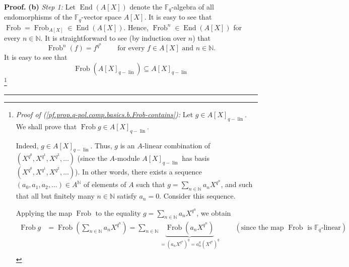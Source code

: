\documentclass[numbers=enddot,12pt,final,onecolumn,notitlepage]{scrartcl}%
\theoremstyle{definition}
\newenvironment{proof}[1][Proof]{\noindent\textbf{#1.} }{\ \rule{0.5em}{0.5em}}
\let\sumnonlimits\sum
\renewcommand{\sum}{\sumnonlimits\limits}
\begin{document}
\begin{proof}
\textbf{(b)} \textit{Step 1:} Let $\operatorname*{End}\left(  A\left[
X\right]  \right)  $ denote the $\mathbb{F}_{q}$-algebra of all endomorphisms
of the $\mathbb{F}_{q}$-vector space $A\left[  X\right]  $. It is easy to see
that $\operatorname*{Frob}=\operatorname*{Frob}\nolimits_{A\left[  X\right]
}\in\operatorname*{End}\left(  A\left[  X\right]  \right)  $. Hence,
$\operatorname*{Frob}\nolimits^{n}\in\operatorname*{End}\left(  A\left[
X\right]  \right)  $ for every $n\in\mathbb{N}$. It is straightforward to see
(by induction over $n$) that%
\begin{equation}
\operatorname*{Frob}\nolimits^{n}\left(  f\right)  =f^{q^{n}}%
\ \ \ \ \ \ \ \ \ \ \text{for every }f\in A\left[  X\right]  \text{ and }%
n\in\mathbb{N}. \label{pf.prop.q-pol.comp.basics.b.Frobn}%
\end{equation}
It is easy to see that
\begin{equation}
\operatorname*{Frob}\left(  A\left[  X\right]  _{q-\operatorname*{lin}%
}\right)  \subseteq A\left[  X\right]  _{q-\operatorname*{lin}}
\label{pf.prop.q-pol.comp.basics.b.Frob-contains}%
\end{equation}
\footnote{\textit{Proof of (\ref{pf.prop.q-pol.comp.basics.b.Frob-contains}):}
Let $g\in A\left[  X\right]  _{q-\operatorname*{lin}}$. We shall prove that
$\operatorname*{Frob}g\in A\left[  X\right]  _{q-\operatorname*{lin}}$.
\par
Indeed, $g\in A\left[  X\right]  _{q-\operatorname*{lin}}$. Thus, $g$ is an
$A$-linear combination of $\left(  X^{q^{0}},X^{q^{1}},X^{q^{2}}%
,\ldots\right)  $ (since the $A$-module $A\left[  X\right]
_{q-\operatorname*{lin}}$ has basis $\left(  X^{q^{0}},X^{q^{1}},X^{q^{2}%
},\ldots\right)  $). In other words, there exists a sequence $\left(
a_{0},a_{1},a_{2},\ldots\right)  \in A^{\mathbb{N}}$ of elements of $A$ such
that $g=\sum_{n\in\mathbb{N}}a_{n}X^{q^{n}}$, and such that all but finitely
many $n\in\mathbb{N}$ satisfy $a_{n}=0$. Consider this sequence.
\par
Applying the map $\operatorname*{Frob}$ to the equality $g=\sum_{n\in
\mathbb{N}}a_{n}X^{q^{n}}$, we obtain%
\begin{align*}
\operatorname*{Frob}g  &  =\operatorname*{Frob}\left(  \sum_{n\in\mathbb{N}%
}a_{n}X^{q^{n}}\right)  =\sum_{n\in\mathbb{N}}\underbrace{\operatorname*{Frob}%
\left(  a_{n}X^{q^{n}}\right)  }_{=\left(  a_{n}X^{q^{n}}\right)  ^{q}%
=a_{n}^{q}\left(  X^{q^{n}}\right)  ^{q}}\ \ \ \ \ \ \ \ \ \ \left(
\text{since the map }\operatorname*{Frob}\text{ is }\mathbb{F}_{q}%
\text{-linear}\right) \\

\end{align*}}
\end{proof}
\end{document}
